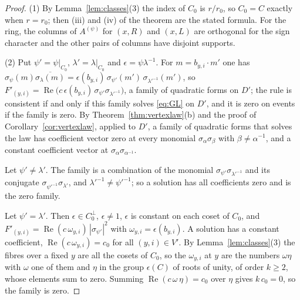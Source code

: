 \begin{proof}
(1) By Lemma~\ref{lem:classes}(3) the index of $C_0$ is $r/r_0$, so $C_0=C$ exactly when $r=r_0$; then (iii) and (iv) of the theorem are the stated formula. For the ring, the columns of $A^{(\psi)}$ for $(x,R)$ and $(x,L)$ are orthogonal for the sign character and the other pairs of columns have disjoint supports.

(2) Put $\psi'=\psi|_{C_0}$, $\lambda'=\lambda|_{C_0}$ and $\epsilon=\psi\lambda^{-1}$. For $m=b_{y,i}\cdot m'$ one has $\sigma_\psi(m)\overline{\sigma_\lambda(m)}=\epsilon(b_{y,i})\,\sigma_{\psi'}(m')\,\sigma_{\lambda'^{-1}}(m')$, so $F'_{(y,i)}=\operatorname{Re}\bigl(c\,\epsilon(b_{y,i})\,\sigma_{\psi'}\sigma_{\lambda'^{-1}}\bigr)$, a family of quadratic forms on $D'$; the rule is consistent if and only if this family solves \eqref{eq:GL} on $D'$, and it is zero on events if the family is zero. By Theorem~\ref{thm:vertexlaw}(b) and the proof of Corollary~\ref{cor:vertexlaw}, applied to $D'$, a family of quadratic forms that solves the law has coefficient vector zero at every monomial $\sigma_\alpha\sigma_\beta$ with $\beta\ne\alpha^{-1}$, and a constant coefficient vector at $\sigma_\alpha\sigma_{\alpha^{-1}}$.

Let $\psi'\ne\lambda'$. The family is a combination of the monomial $\sigma_{\psi'}\sigma_{\lambda'^{-1}}$ and its conjugate $\sigma_{\psi'^{-1}}\sigma_{\lambda'}$, and $\lambda'^{-1}\ne\psi'^{-1}$; so a solution has all coefficients zero and is the zero family.

Let $\psi'=\lambda'$. Then $\epsilon\in C_0^\perp$, $\epsilon\ne1$, $\epsilon$ is constant on each coset of $C_0$, and $F'_{(y,i)}=\operatorname{Re}(c\,\omega_{y,i})\,|\sigma_{\psi'}|^2$ with $\omega_{y,i}=\epsilon(b_{y,i})$. A solution has a constant coefficient, $\operatorname{Re}(c\,\omega_{y,i})=c_0$ for all $(y,i)\in V'$. By Lemma~\ref{lem:classes}(3) the fibres over a fixed $y$ are all the cosets of $C_0$, so the $\omega_{y,i}$ at $y$ are the numbers $\omega\eta$ with $\omega$ one of them and $\eta$ in the group $\epsilon(C)$ of roots of unity, of order $k\ge2$, whose elements sum to zero. Summing $\operatorname{Re}(c\,\omega\,\eta)=c_0$ over $\eta$ gives $k\,c_0=0$, so the family is zero.
\end{proof}

